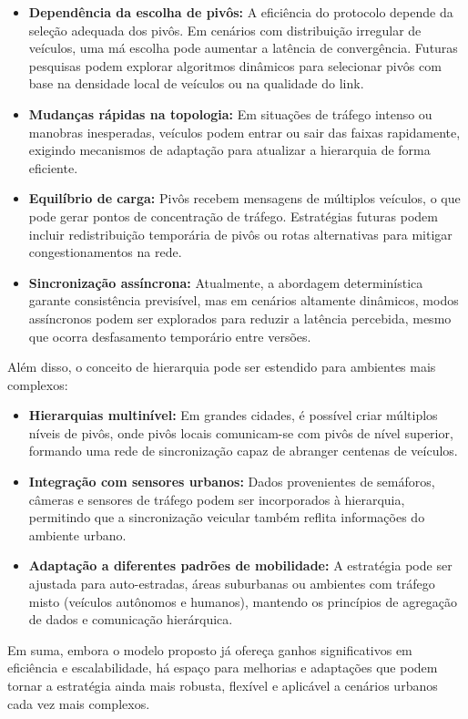 \begin{itemize}
\item \textbf{Dependência da escolha de pivôs:} A eficiência do protocolo depende da seleção adequada dos pivôs. Em cenários com distribuição irregular de veículos, uma má escolha pode aumentar a latência de convergência. Futuras pesquisas podem explorar algoritmos dinâmicos para selecionar pivôs com base na densidade local de veículos ou na qualidade do link.
\item \textbf{Mudanças rápidas na topologia:} Em situações de tráfego intenso ou manobras inesperadas, veículos podem entrar ou sair das faixas rapidamente, exigindo mecanismos de adaptação para atualizar a hierarquia de forma eficiente.
\item \textbf{Equilíbrio de carga:} Pivôs recebem mensagens de múltiplos veículos, o que pode gerar pontos de concentração de tráfego. Estratégias futuras podem incluir redistribuição temporária de pivôs ou rotas alternativas para mitigar congestionamentos na rede.
\item \textbf{Sincronização assíncrona:} Atualmente, a abordagem determinística garante consistência previsível, mas em cenários altamente dinâmicos, modos assíncronos podem ser explorados para reduzir a latência percebida, mesmo que ocorra desfasamento temporário entre versões.
\end{itemize}

Além disso, o conceito de hierarquia pode ser estendido para ambientes mais complexos:

\begin{itemize}
\item \textbf{Hierarquias multinível:} Em grandes cidades, é possível criar múltiplos níveis de pivôs, onde pivôs locais comunicam-se com pivôs de nível superior, formando uma rede de sincronização capaz de abranger centenas de veículos.
\item \textbf{Integração com sensores urbanos:} Dados provenientes de semáforos, câmeras e sensores de tráfego podem ser incorporados à hierarquia, permitindo que a sincronização veicular também reflita informações do ambiente urbano.
\item \textbf{Adaptação a diferentes padrões de mobilidade:} A estratégia pode ser ajustada para auto-estradas, áreas suburbanas ou ambientes com tráfego misto (veículos autônomos e humanos), mantendo os princípios de agregação de dados e comunicação hierárquica.
\end{itemize}

Em suma, embora o modelo proposto já ofereça ganhos significativos em eficiência e escalabilidade, há espaço para melhorias e adaptações que podem tornar a estratégia ainda mais robusta, flexível e aplicável a cenários urbanos cada vez mais complexos.

